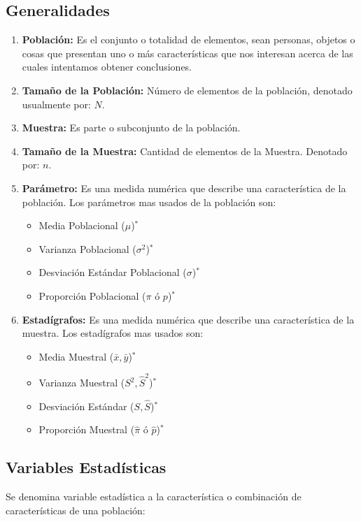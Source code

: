 \subsection{Generalidades}
\begin{enumerate}[label=(\roman*)]

\item \textbf{Población:} Es el conjunto o totalidad de elementos, sean personas, objetos o cosas que presentan uno o más características que nos interesan acerca de las cuales intentamos obtener conclusiones.

\item \textbf{Tamaño de la Población:} Número de elementos de la población, denotado usualmente por: $N$. 

\item \textbf{Muestra: } Es parte o subconjunto de la población.

\item \textbf{Tamaño de la Muestra: } Cantidad de elementos de la Muestra. Denotado por: $n$.

\item \textbf{Parámetro:} Es una medida numérica que describe una característica de la población. Los parámetros mas usados de la población son:
\begin{itemize}
\item Media Poblacional ($\mu$)$^\ast$
\item Varianza Poblacional ($\sigma^2$)$^\ast$
\item Desviación Estándar Poblacional ($\sigma$)$^\ast$
\item Proporción Poblacional ($\pi$ ó $p$)$^\ast$
\end{itemize}
\item \textbf{Estadígrafos:} Es una medida numérica que describe una característica de la muestra. Los estadígrafos mas usados son:
\begin{itemize}
\item Media Muestral ($\bar{x},\bar{y}$)$^\ast$
\item Varianza Muestral ($S^2,\hat{S}^2$)$^\ast$
\item Desviación Estándar ($S,\hat{S}$)$^\ast$
\item Proporción Muestral ($\hat{\pi}$ ó $\hat{p}$)$^\ast$
\end{itemize}
\end{enumerate}

\subsection{Variables Estadísticas}
Se denomina variable estadística a la característica o combinación de características de una población:
